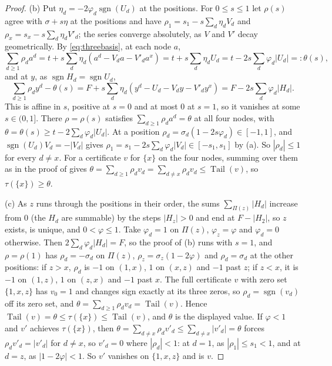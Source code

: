 \documentclass[11pt]{article}
\DeclareMathOperator{\Tail}{Tail}
\DeclareMathOperator{\sgn}{sgn}
\begin{document}
\begin{proof}
(b) Put $\eta_d=-2\varphi_d\sgn(U_d)$ at the positions.  For $0\le s\le1$
let $\rho(s)$ agree with $\sigma+s\eta$ at the positions and have
$\rho_1=s_1-s\sum_d\eta_dV_d$ and $\rho_x=s_x-s\sum_d\eta_dV'_d$; the series
converge absolutely, as $V$ and $V'$ decay geometrically.  By
\eqref{eq:threebasis}, at each node $a$,
\[
  \sum_{d\ge1}\rho_da^d=t+s\sum_d\eta_d(a^d-V_da-V'_da^x)
  =t+s\sum_d\eta_dU_d=t-2s\sum_d\varphi_d|U_d|=:\theta(s),
\]
and at $y$, as $\sgn H_d=\sgn U_d$,
\[
  \sum_{d\ge1}\rho_dy^d-\theta(s)=F+s\sum_d\eta_d(y^d-U_d-V_dy-V'_dy^x)
  =F-2s\sum_d\varphi_d|H_d| .
\]
This is affine in $s$, positive at $s=0$ and at most $0$ at $s=1$, so it
vanishes at some $s\in(0,1]$.  There $\rho=\rho(s)$ satisfies
$\sum_{d\ge1}\rho_da^d=\theta$ at all four nodes, with
$\theta=\theta(s)\ge t-2\sum_d\varphi_d|U_d|$.  At a position
$\rho_d=\sigma_d(1-2s\varphi_d)\in[-1,1]$, and $\sgn(U_d)V_d=-|V_d|$ gives
$\rho_1=s_1-2s\sum_d\varphi_d|V_d|\in[-s_1,s_1]$ by (a).  So $|\rho_d|\le1$
for every $d\ne x$.  For a certificate $v$ for $\{x\}$ on the four nodes,
summing over them as in the proof of \cite[Lemma~5.1]{coefficient-mass-attainment} gives
$\theta=\sum_{d\ge1}\rho_dv_d=\sum_{d\ne x}\rho_dv_d\le\Tail(v)$, so
$\tau(\{x\})\ge\theta$.

(c) As $z$ runs through the positions in their order, the sums
$\sum_{\Pi(z)}|H_d|$ increase from $0$ (the $H_d$ are summable) by the
steps $|H_z|>0$ and end at $F-|H_2|$, so $z$ exists, is unique, and
$0<\varphi\le1$.  Take $\varphi_d=1$ on $\Pi(z)$, $\varphi_z=\varphi$ and
$\varphi_d=0$ otherwise.  Then $2\sum_d\varphi_d|H_d|=F$, so the proof of
(b) runs with $s=1$, and $\rho=\rho(1)$ has $\rho_d=-\sigma_d$ on $\Pi(z)$,
$\rho_z=\sigma_z(1-2\varphi)$ and $\rho_d=\sigma_d$ at the other positions:
if $z>x$, $\rho_d$ is $-1$ on $(1,x)$, $1$ on $(x,z)$ and $-1$ past $z$; if
$z<x$, it is $-1$ on $(1,z)$, $1$ on $(z,x)$ and $-1$ past $x$.  The full
certificate $v$ with zero set $\{1,x,z\}$ has $v_0=1$ and changes sign
exactly at its three zeros, so $\rho_d=\sgn(v_d)$ off its zero set, and
$\theta=\sum_{d\ge1}\rho_dv_d=\Tail(v)$.  Hence
$\Tail(v)=\theta\le\tau(\{x\})\le\Tail(v)$, and $\theta$ is the displayed
value.  If $\varphi<1$ and $v'$ achieves $\tau(\{x\})$, then
$\theta=\sum_{d\ne x}\rho_dv'_d\le\sum_{d\ne x}|v'_d|=\theta$ forces
$\rho_dv'_d=|v'_d|$ for $d\ne x$, so $v'_d=0$ where $|\rho_d|<1$: at $d=1$,
as $|\rho_1|\le s_1<1$, and at $d=z$, as $|1-2\varphi|<1$.  So $v'$ vanishes
on $\{1,x,z\}$ and is $v$.
\end{proof}
\end{document}
